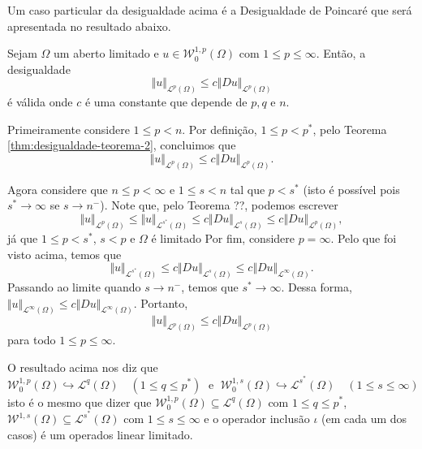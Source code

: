 \documentclass[a4paper, 11pt]{book}
\theoremstyle{definition}
\newcommand{\cL}{\mathcal{L}}
\newcommand{\cW}{\mathcal{W}}
\begin{document}
Um caso particular da desigualdade acima é a Desigualdade de Poincaré que será apresentada no resultado abaixo.

\begin{cbox}
   Sejam $\Omega$ um aberto limitado e $u \in \cW^{1,p}_0(\Omega)$ com $1 \leqslant p \leqslant \infty$. Então, a desigualdade
   \[
        \Vert u \Vert_{\cL^p(\Omega)} \leqslant c\Vert Du \Vert_{\cL^p(\Omega)}
   \]
   é válida
   onde $c$ é uma constante que depende de $p, q$ e $n$.
\end{cbox}
\begin{prf}
    Primeiramente considere $1 \leqslant p < n$.
    Por definição, $1 \leqslant p < p^*$, pelo Teorema \ref{thm:desigualdade-teorema-2}, concluimos que
    \[
        \Vert u \Vert_{\cL^p(\Omega)} \leqslant c \Vert Du \Vert_{\cL^p(\Omega)}.
    \]

    Agora considere que $n \leqslant p < \infty$ e $1 \leqslant s < n$ tal que $p < s^*$ (isto é possível pois $s^* \to \infty$ se $s \to n^-$).
    Note que, pelo Teorema ??, podemos escrever
    \[
        \Vert u \Vert_{\cL^p(\Omega)} \leqslant \Vert u \Vert_{\cL^{s^*}(\Omega)} \leqslant c \Vert Du \Vert_{\cL^s(\Omega)} \leqslant c \Vert Du \Vert_{\cL^p(\Omega)},
    \]
    já que $1 \leqslant p < s^*$, $s < p$ e $\Omega$ é limitado
    Por fim, considere $p = \infty$.
    Pelo que foi visto acima, temos que
    \[
        \Vert u \Vert_{\cL^{s^*}(\Omega)} \leqslant c \Vert Du \Vert_{\cL^{s}(\Omega)} \leqslant c \Vert Du \Vert_{\cL^\infty(\Omega)}.
    \]
    Passando ao limite quando $s \to n^-$, temos que $s^* \to \infty$. Dessa forma, $\Vert u \Vert_{\cL^\infty(\Omega)} \leqslant c \Vert Du \Vert_{\cL^\infty(\Omega)}$.
    Portanto,
    \[
        \Vert u \Vert_{\cL^p(\Omega)} \leqslant c\Vert Du \Vert_{\cL^p(\Omega)}
    \]
    para todo $1 \leqslant p \leqslant \infty$.
\end{prf}

O resultado acima nos diz que
\[
    \cW^{1,p}_0(\Omega) \hookrightarrow \cL^q(\Omega) \quad (1 \leqslant q \leqslant p^*) \;\text{ e }\; \cW^{1,s}_0(\Omega) \hookrightarrow \cL^{s^*}(\Omega) \quad (1 \leqslant s \leqslant \infty)
\]
isto é o mesmo que dizer que $\cW^{1,p}_0(\Omega) \subseteq \cL^q(\Omega)$ com $1 \leqslant q \leqslant p^*$, $\cW^{1,s}(\Omega) \subseteq \cL^{s^*}(\Omega)$ com $1 \leqslant s \leqslant \infty$ e o operador inclusão $\iota$ (em cada um dos casos) é um operados linear limitado.
\end{document}

